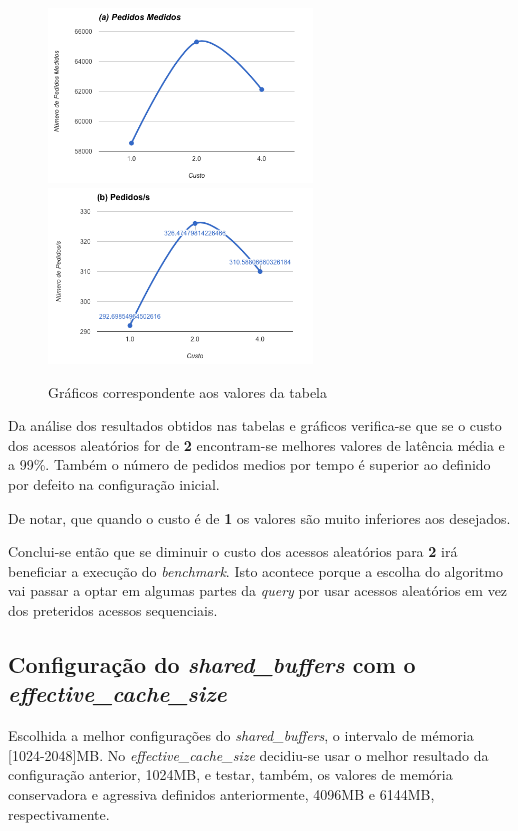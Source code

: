 \begin{figure}[ht!]
\centering
\includegraphics[width=70mm]{img/07_rpc_a.png}
\includegraphics[width=70mm]{img/07_rpc_b.png}
\caption{Gráficos correspondente aos valores da tabela \label{overflow}}
\end{figure}

Da análise dos resultados obtidos nas tabelas e gráficos verifica-se que se o custo dos acessos aleatórios for de \textbf{2} encontram-se melhores valores de latência média e a 99\%. Também o número de pedidos medios por tempo é superior ao definido por defeito na configuração inicial.

De notar, que quando o custo é de \textbf{1} os valores são muito inferiores aos desejados.

Conclui-se então que se diminuir o custo dos acessos aleatórios para \textbf{2} irá beneficiar a execução do \textit{benchmark}. Isto acontece porque a escolha do algoritmo vai passar a optar em algumas partes da \textit{query} por usar acessos aleatórios em vez dos preteridos acessos sequenciais.

\newpage

\subsection{Configuração do \textit{shared\_buffers} com o \textit{effective\_cache\_size}}

Escolhida a melhor configurações do \textit{shared\_buffers}, o intervalo de mémoria [1024-2048]MB. No \textit{effective\_cache\_size} decidiu-se usar o melhor resultado da configuração anterior, 1024MB, e testar, também, os valores de memória conservadora e agressiva definidos anteriormente, 4096MB e 6144MB, respectivamente.

